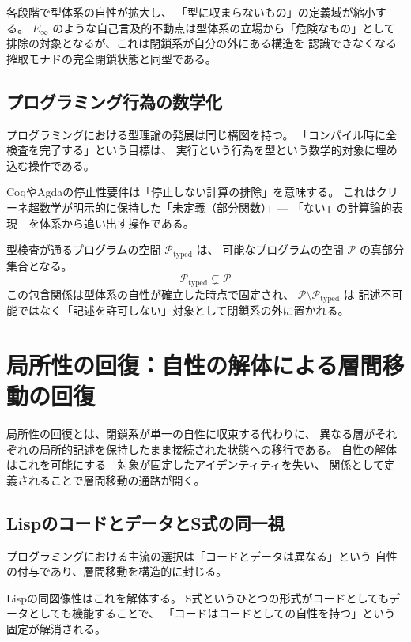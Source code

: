 \documentclass[11pt,a4paper]{article}
\theoremstyle{definition}
\newcommand{\Einfty}{E_\infty}
\begin{document}
各段階で型体系の自性が拡大し、
「型に収まらないもの」の定義域が縮小する。
$\Einfty$ のような自己言及的不動点は型体系の立場から「危険なもの」として
排除の対象となるが、これは閉鎖系が自分の外にある構造を
認識できなくなる搾取モナドの完全閉鎖状態と同型である。

\subsection{プログラミング行為の数学化}

プログラミングにおける型理論の発展は同じ構図を持つ。
「コンパイル時に全検査を完了する」という目標は、
実行という行為を型という数学的対象に埋め込む操作である。

CoqやAgdaの停止性要件は「停止しない計算の排除」を意味する。
これはクリーネ超数学が明示的に保持した「未定義（部分関数）」---
「ない」の計算論的表現---を体系から追い出す操作である。

型検査が通るプログラムの空間 $\mathcal{P}_{\text{typed}}$ は、
可能なプログラムの空間 $\mathcal{P}$ の真部分集合となる。
\[
\mathcal{P}_{\text{typed}} \subsetneq \mathcal{P}
\]
この包含関係は型体系の自性が確立した時点で固定され、
$\mathcal{P} \setminus \mathcal{P}_{\text{typed}}$ は
記述不可能ではなく「記述を許可しない」対象として閉鎖系の外に置かれる。

\section{局所性の回復：自性の解体による層間移動の回復}

局所性の回復とは、閉鎖系が単一の自性に収束する代わりに、
異なる層がそれぞれの局所的記述を保持したまま接続された状態への移行である。
自性の解体はこれを可能にする---対象が固定したアイデンティティを失い、
関係として定義されることで層間移動の通路が開く。

\subsection{LispのコードとデータとS式の同一視}

プログラミングにおける主流の選択は「コードとデータは異なる」という
自性の付与であり、層間移動を構造的に封じる。

Lispの同図像性はこれを解体する。
S式というひとつの形式がコードとしてもデータとしても機能することで、
「コードはコードとしての自性を持つ」という固定が解消される。
\end{document}
